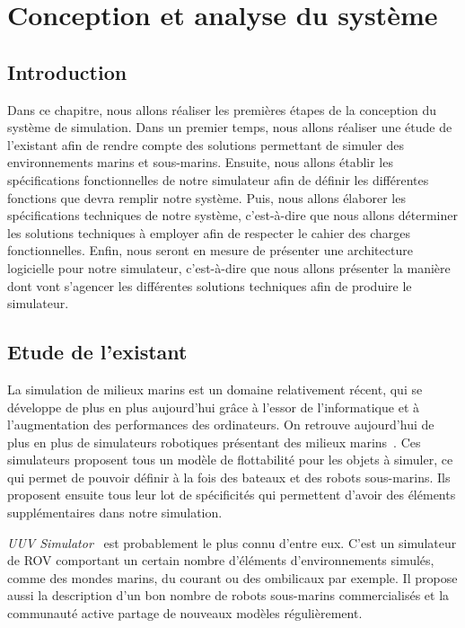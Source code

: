 \chapter{Conception et analyse du système}
\label{chapitre:systeme}

    \section{Introduction}

        Dans ce chapitre, nous allons réaliser les premières étapes de la conception du système de simulation. Dans un premier temps, nous allons réaliser une étude de l'existant afin de rendre compte des solutions permettant de simuler des environnements marins et sous-marins. Ensuite, nous allons établir les spécifications fonctionnelles de notre simulateur afin de définir les différentes fonctions que devra remplir notre système. Puis, nous allons élaborer les spécifications techniques de notre système, c’est-à-dire que nous allons déterminer les solutions techniques à employer afin de respecter le cahier des charges fonctionnelles. Enfin, nous seront en mesure de présenter une architecture logicielle pour notre simulateur, c'est-à-dire que nous allons présenter la manière dont vont s'agencer les différentes solutions techniques afin de produire le simulateur.

    \section{Etude de l'existant}

        La simulation de milieux marins est un domaine relativement récent, qui se développe de plus en plus aujourd'hui grâce à l'essor de l'informatique et à l'augmentation des performances des ordinateurs. On retrouve aujourd'hui de plus en plus de simulateurs robotiques présentant des milieux marins~\cite{Manhaes_2016, bingham19toward, MARS, Rock}. Ces simulateurs proposent tous un modèle de flottabilité pour les objets à simuler, ce qui permet de pouvoir définir à la fois des bateaux et des robots sous-marins. Ils proposent ensuite tous leur lot de spécificités qui permettent d'avoir des éléments supplémentaires dans notre simulation.
        
        \textit{UUV Simulator}~\cite{Manhaes_2016} est probablement le plus connu d'entre eux. C'est un simulateur de \gls{ROV} comportant un certain nombre d'éléments d'environnements simulés, comme des mondes marins, du courant ou des ombilicaux par exemple. Il propose aussi la description d'un bon nombre de robots sous-marins commercialisés et la communauté active partage de nouveaux modèles régulièrement.
        
